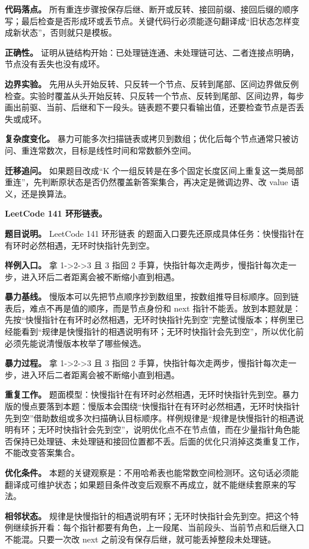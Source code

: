 \textbf{代码落点。} 所有重连步骤按保存后继、断开或反转、接回前缀、接回后缀的顺序写；最后检查是否形成环或丢节点。关键代码行必须能逐句翻译成“旧状态怎样变成新状态”，否则就只是模板。

\textbf{正确性。} 证明从链结构开始：已处理链连通、未处理链可达、二者连接点明确，节点没有丢失也没有成环。

\textbf{边界实验。} 先用从头开始反转、只反转一个节点、反转到尾部、区间边界做反例检查。实验时覆盖从头开始反转、只反转一个节点、反转到尾部、区间边界，每步画出前驱、当前、后继和下一段头。链表题不要只看输出值，还要检查节点是否丢失或成环。

\textbf{复杂度变化。} 暴力可能多次扫描链表或拷贝到数组；优化后每个节点通常只被访问、重连常数次，目标是线性时间和常数额外空间。

\textbf{迁移追问。} 如果题目改成“K 个一组反转是在多个固定长度区间上重复这一类局部重连”，先判断原状态是否仍然覆盖新答案集合，再决定是微调边界、改 value 语义，还是换算法。

\noindent\textbf{LeetCode 141 环形链表。}

\textbf{题目说明。} LeetCode 141 环形链表 的题面入口要先还原成具体任务：快慢指针在有环时必然相遇，无环时快指针先到空。

\textbf{样例入口。} 拿 1->2->3 且 3 指回 2 手算，快指针每次走两步，慢指针每次走一步，进入环后二者距离会被不断缩小直到相遇。

\textbf{暴力基线。} 慢版本可以先把节点顺序抄到数组里，按数组推导目标顺序。回到链表后，难点不再是值的顺序，而是节点身份和 next 指针不能丢。放到本题就是：先按“快慢指针在有环时必然相遇，无环时快指针先到空”完整试慢版本；样例里已经能看到“规律是快慢指针的相遇说明有环；无环时快指针会先到空”，所以优化前必须先能说清慢版本枚举了哪些候选。

\textbf{暴力过程。} 拿 1->2->3 且 3 指回 2 手算，快指针每次走两步，慢指针每次走一步，进入环后二者距离会被不断缩小直到相遇。

\textbf{重复工作。} 题面模型：快慢指针在有环时必然相遇，无环时快指针先到空。暴力版的慢点要落到本题：慢版本会围绕“快慢指针在有环时必然相遇，无环时快指针先到空”借助数组或多次扫描确认目标顺序。样例规律是“规律是快慢指针的相遇说明有环；无环时快指针会先到空”，说明优化点不在节点值，而在少量指针角色能否保持已处理链、未处理链和接回位置都不丢。后面的优化只消掉这类重复工作，不能改变答案集合。

\textbf{优化条件。} 本题的关键观察是：不用哈希表也能常数空间检测环。这句话必须能翻译成可维护状态；如果题目条件改变后观察不再成立，就不能继续套原来的写法。

\textbf{相邻状态。} 规律是快慢指针的相遇说明有环；无环时快指针会先到空。把这个特例继续拆开看：每个指针都要有角色，上一段尾、当前段头、当前节点和后继入口不能混。只要一次改 next 之前没有保存后继，就可能丢掉整段未处理链。

